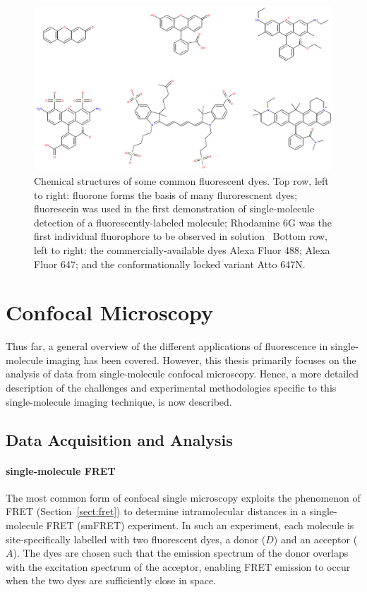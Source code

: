 \begin{figure}
	\begin{center}
	\includegraphics*[clip=true, width=5in]{introduction/dyes.pdf}
	\caption{Chemical structures of some common fluorescent dyes. Top row, left to right: fluorone forms the basis of many flurorescnent dyes; fluorescein was used in the first demonstration of single-molecule detection of a fluorescently-labeled molecule; Rhodamine 6G was the first individual fluorophore to be observed in solution~\cite{Shera1990} Bottom row, left to right: the commercially-available dyes Alexa Fluor 488; Alexa Fluor 647; and the conformationally locked variant Atto 647N.}
	\label{fig:dyes}
	\end{center}
\end{figure}


\section{Confocal Microscopy}
Thus far, a general overview of the different applications of fluorescence in single-molecule imaging has been covered. However, this thesis primarily focuses on the analysis of data from single-molecule confocal microscopy. Hence, a more detailed description of the challenges and experimental methodologies specific to this single-molecule imaging technique, is now described.

\subsection{Data Acquisition and Analysis}
\paragraph{single-molecule FRET}
\label{par:FRET}
The most common form of confocal single microscopy exploits the phenomenon of FRET (Section~\ref{sect:fret}) to determine intramolecular distances in a single-molecule FRET (smFRET) experiment. In such an experiment, each molecule is site-specifically labelled with two fluorescent dyes, a donor ($D$) and an acceptor ($A$). The dyes are chosen such that the emission spectrum of the donor overlaps with the excitation spectrum of the acceptor, enabling FRET emission to occur when the two dyes are sufficiently close in space. 

